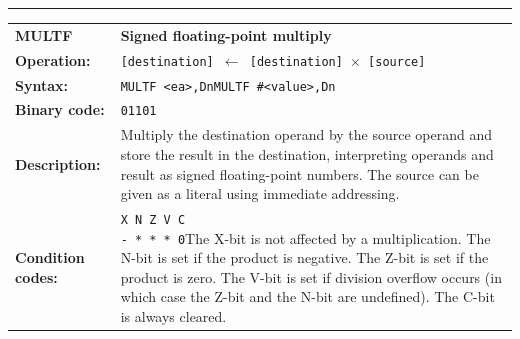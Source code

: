 \documentclass[]{article}
\begin{document}
\begin{appendices}
\noindent\rule{10cm}{1pt}\newline %
\setlength\extrarowheight{5pt} %
\begin{tabularx}{\textwidth}{lL}
  {\Large \textbf{MULTF}} 	& {\Large \textbf{Signed floating-point multiply}}\\
  \textbf{Operation:} 		& \texttt{[destination] $\leftarrow$ [destination] $\times$ [source]}\\
  \textbf{Syntax:}  		& \texttt{MULTF <ea>,Dn}\newline\texttt{MULTF \#<value>,Dn}\\
  \textbf{Binary code:} 	& \texttt{01101}\\
  \textbf{Description:}  	& Multiply the destination operand by the source operand and store
the result in the destination, interpreting operands and result as signed floating-point numbers. The source can be given as a literal using immediate addressing.\\
  \textbf{Condition codes:} & \texttt{X N Z V C\newline - * * * 0}\newline\newline The X-bit is not affected by a multiplication. The N-bit is set if the 
product is negative. The Z-bit is set if the product is zero. The V-bit
is set if division overflow occurs (in which case the Z-bit and the N-bit
are undefined). The C-bit is always cleared.\\
\end{tabularx}
\newline

\newpage


\end{appendices}
\end{document}
